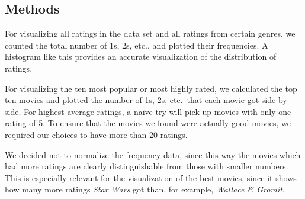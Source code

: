 \subsection{Methods}
For visualizing all ratings in the data set and all ratings from certain genres, we counted the total number of 1s, 2s, etc., and plotted their frequencies. A histogram like this provides an accurate visualization of the distribution of ratings. 

For visualizing the ten most popular or most highly rated, we calculated the top ten movies and plotted the number of 1s, 2s, etc.\ that each movie got side by side.  For highest average ratings, a na\"{i}ve try will pick up movies with only one rating of 5.  To ensure that the movies we found were actually good movies, we required our choices to have more than 20 ratings.

We decided not to normalize the frequency data, since this way the movies which had more ratings are clearly distinguishable from those with smaller numbers.  This is especially relevant for the visualization of the best movies, since it shows how many more ratings \emph{Star Wars} got than, for example, \emph{Wallace \& Gromit}.

\newpage


